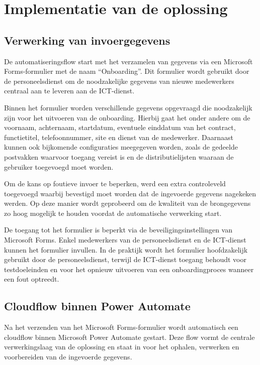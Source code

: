 
\chapter{Implementatie van de oplossing}
\label{ch:ImplementatieVanDeOplossing}

\section{Verwerking van invoergegevens}

De automatiseringsflow start met het verzamelen van gegevens via een Microsoft Forms-formulier met de naam ``Onboarding''. Dit formulier wordt gebruikt door de personeelsdienst om de noodzakelijke gegevens van nieuwe medewerkers centraal aan te leveren aan de ICT-dienst.

Binnen het formulier worden verschillende gegevens opgevraagd die noodzakelijk zijn voor het uitvoeren van de onboarding. Hierbij gaat het onder andere om de voornaam, achternaam, startdatum, eventuele einddatum van het contract, functietitel, telefoonnummer, site en dienst van de medewerker. Daarnaast kunnen ook bijkomende configuraties meegegeven worden, zoals de gedeelde postvakken waarvoor toegang vereist is en de distributielijsten waaraan de gebruiker toegevoegd moet worden.

Om de kans op foutieve invoer te beperken, werd een extra controleveld toegevoegd waarbij bevestigd moet worden dat de ingevoerde gegevens nagekeken werden. Op deze manier wordt geprobeerd om de kwaliteit van de brongegevens zo hoog mogelijk te houden voordat de automatische verwerking start.

De toegang tot het formulier is beperkt via de beveiligingsinstellingen van Microsoft Forms. Enkel medewerkers van de personeelsdienst en de ICT-dienst kunnen het formulier invullen. In de praktijk wordt het formulier hoofdzakelijk gebruikt door de personeelsdienst, terwijl de ICT-dienst toegang behoudt voor testdoeleinden en voor het opnieuw uitvoeren van een onboardingproces wanneer een fout optreedt.

\section{Cloudflow binnen Power Automate}

Na het verzenden van het Microsoft Forms-formulier wordt automatisch een cloudflow binnen Microsoft Power Automate gestart. Deze flow vormt de centrale verwerkingslaag van de oplossing en staat in voor het ophalen, verwerken en voorbereiden van de ingevoerde gegevens.

